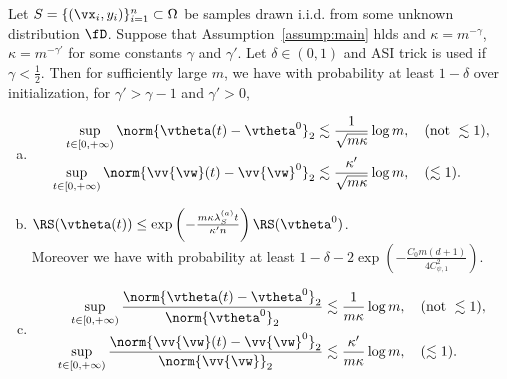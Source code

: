 \documentclass{article}
\begin{document}
\begin{thm}
    Let $S=\{(\vx_i,y_i)\}_{i=1}^{n}\subset\Omega$ be samples drawn i.i.d. from some unknown distribution $\fD$. Suppose that Assumption~\ref{assump:main} hlds and $\kappa=m^{-\gamma}$, $\kappa=m^{-\gamma'}$ for some constants $\gamma$ and $\gamma'$. Let $\delta\in(0,1)$ and ASI trick is used if $\gamma<\frac{1}{2}$. Then for sufficiently large $m$, we have with probability at least $1-\delta$ over initialization, for $\gamma'>\gamma-1$ and $\gamma'>0$,
    \begin{enumerate}[(a)]
        \item \begin{equation}
                  \begin{aligned}
                      \sup\limits_{t\in[0,+\infty)}\norm{\vtheta(t)-\vtheta^0}_2
                       & \lesssim\frac{1}{\sqrt{m\kappa}}\log m, \quad (\text{not }\lesssim 1), \\
                      \sup\limits_{t\in[0,+\infty)}\norm{\vv{\vw}(t)-\vv{\vw}^0}_2
                       & \lesssim\frac{\kappa'}{\sqrt{m\kappa}}\log m, \quad (\lesssim 1).
                  \end{aligned}
              \end{equation}
        \item $\RS(\vtheta(t))\leq\exp\left(-\frac{m\kappa\lambda_S^{(a)}t}{\kappa'n}\right)\RS(\vtheta^0)$. \\
              Moreover we have with probability at least $1-\delta-2\exp\left(-\frac{C_0m(d+1)}{4C_{\psi,1}^2}\right)$.
        \item \begin{equation}
                  \begin{aligned}
                      \sup\limits_{t\in[0,+\infty)}\frac{\norm{\vtheta(t)-\vtheta^0}_2}{\norm{\vtheta^0}_2}
                       & \lesssim\frac{1}{m\kappa}\log m, \quad (\text{not }\lesssim 1), \\
                      \sup\limits_{t\in[0,+\infty)}\frac{\norm{\vv{\vw}(t)-\vv{\vw}^0}_2}{\norm{\vv{\vw}}_2}
                       & \lesssim\frac{\kappa'}{m\kappa}\log m, \quad (\lesssim 1).
                  \end{aligned}
              \end{equation}
    \end{enumerate}
\end{thm}
\end{document}
